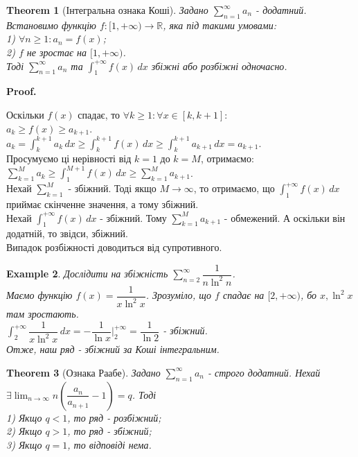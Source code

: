 \documentclass[a4paper, 10pt]{article}
\makeatletter
\def\huge{\displaystyle}
\def\qed{$\blacksquare$}
\theoremstyle{theoremdd}
\newtheorem{theorem}{Theorem}[subsection]
\theoremstyle{theoremdd}
\theoremstyle{theoremdd}
\theoremstyle{theoremdd}
\theoremstyle{theoremdd}
\newtheorem{example}[theorem]{Example}
\theoremstyle{theoremdd}
\theoremstyle{theoremdd}
\theoremstyle{theoremdd}
\theoremstyle{theoremdd}
\renewenvironment{proof}[1][Proof.\\]{\par
\pushQED{\hfill \qed}%
\normalfont \topsep6\p@\@plus6\p@\relax
\trivlist
\item\relax
{\bfseries
#1\@addpunct{.}}\hspace\labelsep\ignorespaces
}{%
\popQED\endtrivlist\@endpefalse
}
\makeatother
\begin{document}
\begin{theorem}[Інтегральна ознака Коші]
Задано $\huge \sum_{n=1}^{\infty} a_n$ - додатний. Встановимо функцію $f: [1,+\infty) \to \mathbb{R}$, яка під такими умовами:\\
1) $\forall n \geq 1: a_n = f(x)$;\\
2) $f$ не зростає на $[1,+\infty)$.\\
Тоді $\huge \sum_{n = 1}^\infty a_n$ та $\huge \int_1^{+\infty} f(x)\,dx$ збіжні або розбіжні одночасно.
\end{theorem}

\begin{proof}
Оскільки $f(x)$ спадає, то $\forall k \geq 1: \forall x \in [k, k+1]:$\\
$a_k \geq f(x) \geq a_{k+1}$.\\
$\huge a_k = \int_k^{k+1} a_k \,dx \geq \int_k^{k+1} f(x)\,dx \geq \int_k^{k+1} a_{k+1}\,dx = a_{k+1}$.\\
Просумуємо ці нерівності від $k = 1$ до $k = M$, отримаємо:\\
$\huge \sum_{k=1}^M a_k \geq \int_1^{M+1} f(x)\,dx \geq \sum_{k=1}^M a_{k+1}$.\\
Нехай $\huge\sum_{k=1}^M$ - збіжний. Тоді якщо $M \to \infty$, то отримаємо, що $\huge\int_1^{+\infty} f(x)\,dx$ приймає скінченне значення, а тому збіжний.\\
Нехай $\huge\int_1^{+\infty} f(x)\,dx$ - збіжний. Тому $\huge\sum_{k=1}^M a_{k+1}$ - обмежений. А оскільки він додатній, то звідси, збіжний.\\
Випадок розбіжності доводиться від супротивного.
\end{proof}

\begin{example}
Дослідити на збіжність $\huge\sum_{n=2}^\infty \dfrac{1}{n \ln^2 n}$.\\
Маємо функцію $f(x) = \dfrac{1}{x \ln^2 x}$. Зрозуміло, що $f$ спадає на $[2,+\infty)$, бо $x, \ln^2 x$ там зростають.\\
$\huge\int_2^{+\infty} \dfrac{1}{x \ln^2 x}\,dx = -\dfrac{1}{\ln x} \Big|_{2}^{+\infty} = \dfrac{1}{\ln 2}$ - збіжний.\\
Отже, наш ряд - збіжний за Коші інтегральним.
\end{example}

\begin{theorem}[Ознака Раабе]
Задано $\huge\sum_{n=1}^\infty a_n$ - строго додатний. Нехай $\exists \huge\lim_{n \to \infty} n \left( \dfrac{a_n}{a_{n+1}} - 1 \right) = q$. Тоді\\
1) Якщо $q < 1$, то ряд - розбіжний;\\
2) Якщо $q > 1$, то ряд - збіжний;\\
3) Якщо $q = 1$, то відповіді нема.
\end{theorem}
\end{document}
